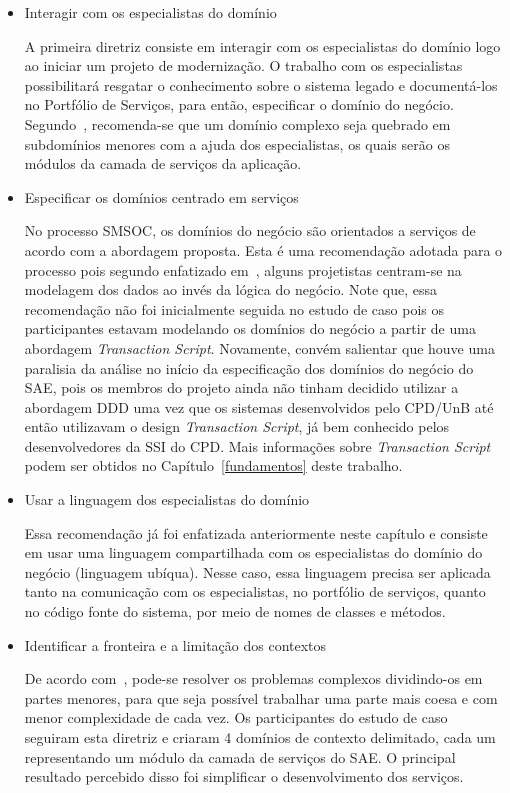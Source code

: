 \begin{itemize}

\item Interagir com os especialistas do domínio

A primeira diretriz consiste em interagir com 
os especialistas do domínio logo ao 
iniciar um projeto de modernização. 
O trabalho com os especialistas 
possibilitará resgatar o conhecimento sobre o 
sistema legado e documentá-los no 
Portfólio de Serviços, para então, 
especificar o domínio do negócio. 
Segundo~\cite{fowler2002patterns},
recomenda-se que um domínio complexo seja 
quebrado em subdomínios menores
com a ajuda dos especialistas, os quais
serão os módulos da camada de serviços da aplicação.

\item Especificar os domínios centrado em serviços

No processo \acrshort{SMSOC},
os domínios do negócio 
são orientados a serviços de 
acordo com a abordagem proposta. Esta
é uma recomendação adotada
para o processo pois
segundo enfatizado
em~\cite{evans2004domain},
alguns projetistas centram-se na modelagem 
dos dados ao invés da lógica do negócio. 
Note que,
essa recomendação não foi inicialmente seguida
no estudo de caso pois 
os participantes
estavam modelando os domínios do negócio
a partir de uma
abordagem \textit{Transaction Script}.
Novamente, convém salientar que
houve uma paralisia da análise no início
da especificação dos domínios
do negócio do \acrshort{SAE},
pois os membros do projeto ainda
não tinham decidido utilizar a abordagem
\acrshort{DDD} uma vez que
os sistemas desenvolvidos pelo CPD/UnB
até então utilizavam o 
design \textit{Transaction Script},
já bem conhecido pelos 
desenvolvedores da \acrfull{SSI} do \acrshort{CPD}. 
Mais informações sobre 
\textit{Transaction Script} podem
ser obtidos no Capítulo~\ref{fundamentos} 
deste trabalho.



\item Usar a linguagem dos especialistas do domínio

Essa recomendação já foi enfatizada 
anteriormente neste capítulo e
consiste em usar uma linguagem compartilhada 
com os especialistas do domínio do negócio (linguagem ubíqua).
Nesse caso,
essa linguagem precisa ser aplicada
tanto na comunicação com os especialistas, 
no portfólio de serviços, 
quanto no código fonte do sistema, 
por meio de nomes de classes e métodos.

\item Identificar a fronteira e a limitação dos contextos

De acordo com~\cite{evans2004domain},
pode-se resolver os problemas complexos 
dividindo-os
em partes menores, 
para que seja possível
trabalhar uma parte mais coesa e com menor complexidade de cada vez.
Os participantes do estudo de caso seguiram 
esta diretriz e criaram 4 domínios de contexto
delimitado, cada um representando um módulo
da camada de serviços do \acrshort{SAE}. 
O principal resultado percebido disso
foi simplificar o desenvolvimento dos serviços.



\end{itemize}

